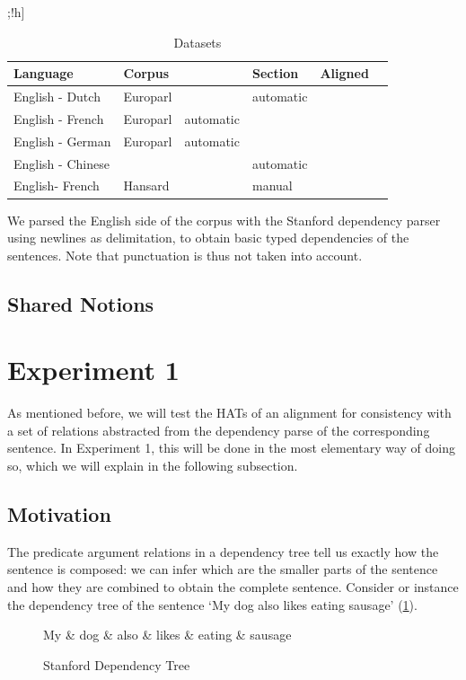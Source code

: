 \documentclass[a4paper, 11pt]{report}
\theoremstyle{definition}
\theoremstyle{plain}
\begin{document}
\begin{table};!h]
\begin{tabular}{llllll}
Language & Corpus & & Section & Aligned\\
\hline
English - Dutch & Europarl & & automatic \\
English - French & Europarl & automatic \\
English - German & Europarl & automatic \\
English - Chinese & & & automatic \\
English- French & Hansard & & manual\\
\end{tabular}
\caption{Datasets}\label{tab:datasets}
\end{table}

We parsed the English side of the corpus with the Stanford dependency parser \citep{de2008stanford} using newlines as delimitation, to obtain basic typed dependencies of the sentences. Note that punctuation is thus not taken into account.

\subsection{Shared Notions}



\section{Experiment 1}

As mentioned before, we will test the HATs of an alignment for consistency with a set of relations abstracted from the dependency parse of the corresponding sentence. In Experiment 1, this will be done in the most elementary way of doing so, which we will explain in the following subsection.

\subsection{Motivation}

The predicate argument relations in a dependency tree tell us exactly how the sentence is composed: we can infer which are the smaller parts of the sentence and how they are combined to obtain the complete sentence. Consider or instance the dependency tree of the sentence `My dog also likes eating sausage' (\ref{fig:deptree}).

\begin{figure}[!h]\label{fig:deptree}
\centering
\begin{dependency}[theme=simple]%
\begin{deptext}[column sep=.5cm, row sep=.1ex]
My \& dog \& also \& likes \& eating \& sausage \\
\end{deptext}
\end{dependency}
\caption{Stanford Dependency Tree}
\end{figure}
\end{document}
